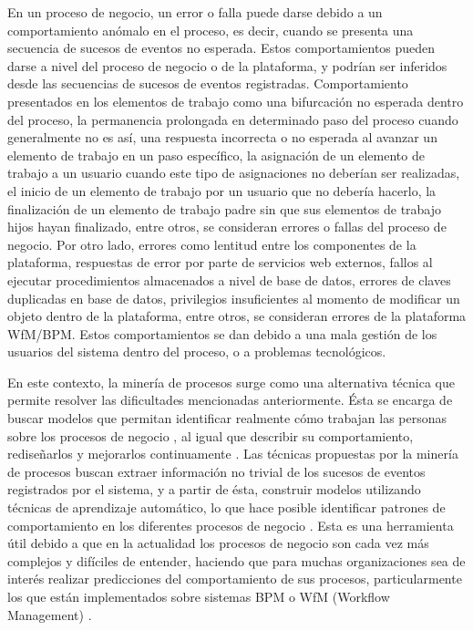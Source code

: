 En un proceso de negocio, un error o falla puede darse debido a un comportamiento anómalo en el proceso, es decir, cuando se presenta una secuencia de sucesos de eventos no esperada. Estos comportamientos pueden darse a nivel del proceso de negocio o de la plataforma, y podrían ser inferidos desde las secuencias de sucesos de eventos registradas. Comportamiento presentados en los elementos de trabajo como una bifurcación no esperada dentro del proceso, la permanencia prolongada en determinado paso del proceso cuando generalmente no es así, una respuesta incorrecta o no esperada al avanzar un elemento de trabajo en un paso específico, la asignación de un elemento de trabajo a un usuario cuando este tipo de asignaciones no deberían ser realizadas, el inicio de un elemento de trabajo por un usuario que no debería hacerlo, la finalización de un elemento de trabajo padre sin que sus elementos de trabajo hijos hayan finalizado, entre otros, se consideran errores o fallas del proceso de negocio. Por otro lado, errores como lentitud entre los componentes de la plataforma, respuestas de error por parte de servicios web externos, fallos al ejecutar procedimientos almacenados a nivel de base de datos, errores de claves duplicadas en base de datos, privilegios insuficientes al momento de modificar un objeto dentro de la plataforma, entre otros, se consideran errores de la plataforma WfM/BPM. Estos comportamientos se dan debido a una mala gestión de los usuarios del sistema dentro del proceso, o a problemas tecnológicos.

En este contexto, la minería de procesos surge como una alternativa técnica que permite resolver las dificultades mencionadas anteriormente. Ésta se encarga de buscar modelos que permitan identificar realmente cómo trabajan las personas sobre los procesos de negocio \cite{VanDerAalst2004_2}, al igual que describir su comportamiento, rediseñarlos y mejorarlos continuamente \cite{VanderAalst2007}. Las técnicas propuestas por la minería de procesos buscan extraer información no trivial de los sucesos de eventos registrados por el sistema, y a partir de ésta, construir modelos utilizando técnicas de aprendizaje automático, lo que hace posible identificar patrones de comportamiento en los diferentes procesos de negocio \cite{VanderAalst2007,VanDerAalst2011}. Esta es una herramienta útil debido a que en la actualidad los procesos de negocio son cada vez más complejos y difíciles de entender, haciendo que para muchas organizaciones sea de interés realizar predicciones del comportamiento de sus procesos, particularmente los que están implementados sobre sistemas BPM o WfM (Workflow Management) \cite{Pandey2011}.


